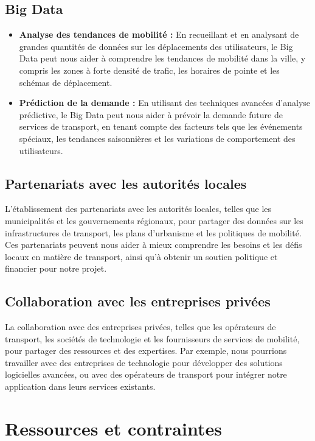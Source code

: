 \documentclass{article}
\begin{document}
\subsection{Big Data}

\begin{itemize}
    \item \textbf{Analyse des tendances de mobilité :} En recueillant et en analysant de grandes quantités de données sur les déplacements des utilisateurs, le Big Data peut nous aider à comprendre les tendances de mobilité dans la ville, y compris les zones à forte densité de trafic, les horaires de pointe et les schémas de déplacement.
    
    \item \textbf{Prédiction de la demande :} En utilisant des techniques avancées d'analyse prédictive, le Big Data peut nous aider à prévoir la demande future de services de transport, en tenant compte des facteurs tels que les événements spéciaux, les tendances saisonnières et les variations de comportement des utilisateurs.
\end{itemize}

\subsection{Partenariats avec les autorités locales}
L'établissement  des partenariats avec les autorités locales, telles que les municipalités et les gouvernements régionaux, pour partager des données sur les infrastructures de transport, les plans d'urbanisme et les politiques de mobilité. Ces partenariats peuvent nous aider à mieux comprendre les besoins et les défis locaux en matière de transport, ainsi qu'à obtenir un soutien politique et financier pour notre projet.

\subsection{Collaboration avec les entreprises privées}
La collaboration  avec des entreprises privées, telles que les opérateurs de transport, les sociétés de technologie et les fournisseurs de services de mobilité, pour partager des ressources et des expertises. Par exemple, nous pourrions travailler avec des entreprises de technologie pour développer des solutions logicielles avancées, ou avec des opérateurs de transport pour intégrer notre application dans leurs services existants.

\section{Ressources et contraintes}
\end{document}
